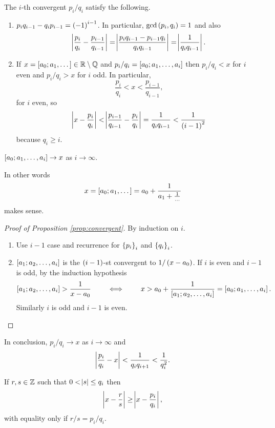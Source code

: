 \begin{proposition}
\label{prop:convergent}
The $ i $-th convergent $ p_i / q_i $ satisfy the following.
\begin{enumerate}
\item $ p_iq_{i - 1} - q_ip_{i - 1} = \br{-1}^{i - 1} $. In particular, $ \gcd\br{p_i, q_i} = 1 $ and also
$$ \abs{\dfrac{p_i}{q_i} - \dfrac{p_{i - 1}}{q_{i - 1}}} = \abs{\dfrac{p_iq_{i - 1} - p_{i - 1}q_i}{q_iq_{i - 1}}} = \abs{\dfrac{1}{q_iq_{i - 1}}}. $$
\item If $ x = \sbr{a_0; a_1, \dots} \in \R \setminus \Q $ and $ p_i / q_i = \sbr{a_0; a_1, \dots, a_i} $ then $ p_i / q_i < x $ for $ i $ even and $ p_i / q_i > x $ for $ i $ odd. In particular,
$$ \dfrac{p_i}{q_i} < x < \dfrac{p_{i - 1}}{q_{i - 1}}, $$
for $ i $ even, so
$$ \abs{x - \dfrac{p_i}{q_i}} < \abs{\dfrac{p_{i - 1}}{q_{i - 1}} - \dfrac{p_i}{q_i}} = \dfrac{1}{q_iq_{i - 1}} < \dfrac{1}{\br{i - 1}^2} $$
because $ q_i \ge i $.
\end{enumerate}
\end{proposition}

\pagebreak

\begin{corollary}
$ \sbr{a_0; a_1, \dots, a_i} \to x $ as $ i \to \infty $.
\end{corollary}

In other words
$$ x = \sbr{a_0; a_1, \dots} = a_0 + \dfrac{1}{a_1 + \tfrac{1}{\dots}} $$
makes sense.

\begin{proof}[Proof of Proposition \ref{prop:convergent}]
By induction on $ i $.
\begin{enumerate}
\item Use $ i - 1 $ case and recurrence for $ \cbr{p_i}_i $ and $ \cbr{q_i}_i $.
\item $ \sbr{a_1; a_2, \dots, a_i} $ is the $ \br{i - 1} $-st convergent to $ 1 / \br{x - a_0} $. If $ i $ is even and $ i - 1 $ is odd, by the induction hypothesis
$$ \sbr{a_1; a_2, \dots, a_i} > \dfrac{1}{x - a_0} \qquad \iff \qquad x > a_0 + \dfrac{1}{\sbr{a_1; a_2, \dots, a_i}} = \sbr{a_0; a_1, \dots, a_i}. $$
Similarly $ i $ is odd and $ i - 1 $ is even.
\end{enumerate}
\end{proof}

In conclusion, $ p_i / q_i \to x $ as $ i \to \infty $ and
$$ \abs{\dfrac{p_i}{q_i} - x} < \dfrac{1}{q_iq_{i + 1}} < \dfrac{1}{q_i^2}. $$

\begin{theorem}
If $ r, s \in \mathbb{Z} $ such that $ 0 < \abs{s} \le q_i $ then
$$ \abs{x - \dfrac{r}{s}} \ge \abs{x - \dfrac{p_i}{q_i}}, $$
with equality only if $ r / s = p_i / q_i $.
\end{theorem}

